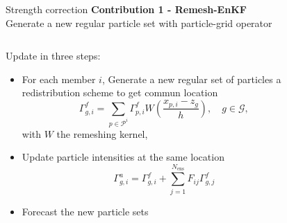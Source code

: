 \documentclass[aspectratio=169]{beamer} %
\begin{document}
\begin{frame}{Strength correction}
    \small
    \textbf{Contribution 1 - Remesh-EnKF} \\

    Generate a new regular particle set with particle-grid operator \\

    \begin{columns}
        \begin{column}{0.6\textwidth}
            Update in three steps:
            \begin{itemize}
                \item For each member $i$, Generate a new regular set of particles a redistribution scheme to get commun location~\footnotemark[1]
                      \begin{equation*}
                          \Gamma^f_{g, i} = \sum_{p \in \mathcal P^i} \Gamma^f_{p, i} W(\frac{x_{p, i} - z_g}{h}), \quad g \in \mathcal G,
                      \end{equation*}
                      with $W$ the remeshing kernel,
                \item Update particle intensities at the same location
                      \begin{equation*}
                          \Gamma^a_{g, i} = \Gamma^f_{g, i} + \sum_{j=1}^{N_{\text{ens}}} F_{ij} \Gamma^f_{g,j}
                      \end{equation*}
                \item Forecast the new particle sets
            \end{itemize}
        \end{column}
        \hspace{-0.2cm}
        \begin{column}{0.3\textwidth}
            \begin{figure}

\end{figure}
\end{column}
\end{columns}
\end{frame}
\end{document}
